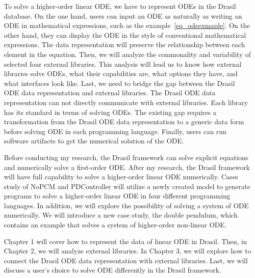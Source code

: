 To solve a higher-order linear ODE, we have to represent ODEs in the Drasil database. On the one hand, users can input an ODE as naturally as writing an ODE in mathematical expressions, such as the example~\ref{eq_odeexmaple}. On the other hand, they can display the ODE in the style of conventional mathematical expressions. The data representation will preserve the relationship between each element in the equation. Then, we will analyze the commonality and variability of selected four external libraries. This analysis will lead us to know how external libraries solve ODEs, what their capabilities are, what options they have, and what interfaces look like. Last, we need to bridge the gap between the Drasil ODE data representation and external libraries. The Drasil ODE data representation can not directly communicate with external libraries. Each library has its standard in terms of solving ODEs. The existing gap requires a transformation from the Drasil ODE data representation to a generic data form before solving ODE in each programming language. Finally, users can run software artifacts to get the numerical solution of the ODE.

Before conducting my research, the Drasil framework can solve explicit equations and numerically solve a first-order ODE. After my research, the Drasil framework will have full capability to solve a higher-order linear ODE numerically. Cases study of NoPCM and PDController will utilize a newly created model to generate programs to solve a higher-order linear ODE in four different programming languages. In addition, we will explore the possibility of solving a system of ODE numerically. We will introduce a new case study, the double pendulum, which contains an example that solves a system of higher-order non-linear ODE.

Chapter 1 will cover how to represent the data of linear ODE in Drasil. Then, in Chapter 2, we will analyze external libraries. In Chapter 3, we will explore how to connect the Drasil ODE data representation with external libraries. Last, we will discuss a user's choice to solve ODE differently in the Drasil framework.